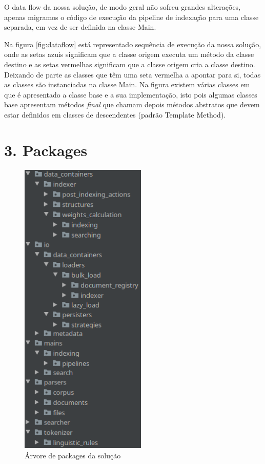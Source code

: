 \documentclass[12pt]{article}
\begin{document}
O data flow da nossa solução, de modo geral não sofreu grandes
alterações, apenas migramos o código de execução da pipeline de
indexação para uma classe separada, em vez de ser definida na
classe Main.

Na figura \ref{fig:dataflow} está representado sequência de execução
da nossa solução, onde as setas azuis significam que a classe origem
executa um método da classe destino e as setas vermelhas significam
que a classe origem cria a classe destino. Deixando de parte as classes
que têm uma seta vermelha a apontar para si, todas as classes são
instanciadas na classe Main. Na figura existem várias classes em que é
apresentado a classe base e a sua implementação, isto pois algumas
classes base apresentam métodos {\it final} que chamam depois métodos
abstratos que devem estar definidos em classes de descendentes (padrão
Template Method).

\section*{3. Packages}
\begin{figure}[H]
  \center
  \includegraphics[width=6cm]{packages_all.png}
  \caption{Árvore de packages da solução}
\end{figure}
\end{document}

